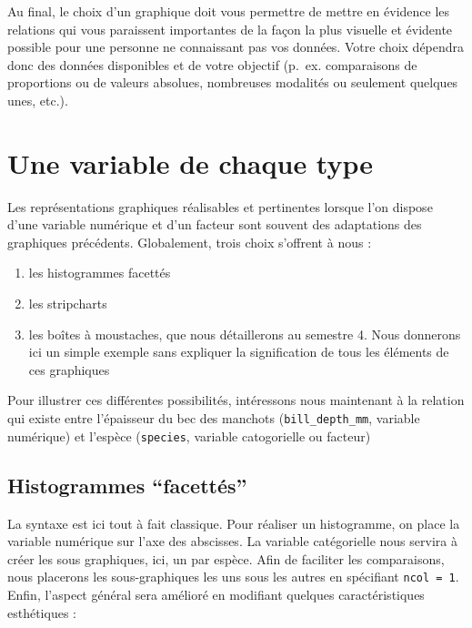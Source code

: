 \documentclass[
  letterpaper,
  DIV=11,
  numbers=noendperiod]{scrreprt}
\providecommand{\tightlist}{%
  \setlength{\itemsep}{0pt}\setlength{\parskip}{0pt}}\usepackage{longtable,booktabs,array}
\begin{document}
Au final, le choix d'un graphique doit vous permettre de mettre en
évidence les relations qui vous paraissent importantes de la façon la
plus visuelle et évidente possible pour une personne ne connaissant pas
vos données. Votre choix dépendra donc des données disponibles et de
votre objectif (p.~ex. comparaisons de proportions ou de valeurs
absolues, nombreuses modalités ou seulement quelques unes, etc.).

\hypertarget{une-variable-de-chaque-type}{%
\section{Une variable de chaque
type}\label{une-variable-de-chaque-type}}

Les représentations graphiques réalisables et pertinentes lorsque l'on
dispose d'une variable numérique et d'un facteur sont souvent des
adaptations des graphiques précédents. Globalement, trois choix
s'offrent à nous :

\begin{enumerate}
\def\labelenumi{\arabic{enumi}.}
\tightlist
\item
  les histogrammes facettés
\item
  les stripcharts
\item
  les boîtes à moustaches, que nous détaillerons au semestre 4. Nous
  donnerons ici un simple exemple sans expliquer la signification de
  tous les éléments de ces graphiques
\end{enumerate}

Pour illustrer ces différentes possibilités, intéressons nous maintenant
à la relation qui existe entre l'épaisseur du bec des manchots
(\texttt{bill\_depth\_mm}, variable numérique) et l'espèce
(\texttt{species}, variable catogorielle ou facteur)

\hypertarget{sec-factorhisto}{%
\subsection{Histogrammes ``facettés''}\label{sec-factorhisto}}

La syntaxe est ici tout à fait classique. Pour réaliser un histogramme,
on place la variable numérique sur l'axe des abscisses. La variable
catégorielle nous servira à créer les sous graphiques, ici, un par
espèce. Afin de faciliter les comparaisons, nous placerons les
sous-graphiques les uns sous les autres en spécifiant
\texttt{ncol\ =\ 1}. Enfin, l'aspect général sera amélioré en modifiant
quelques caractéristiques esthétiques :
\end{document}
